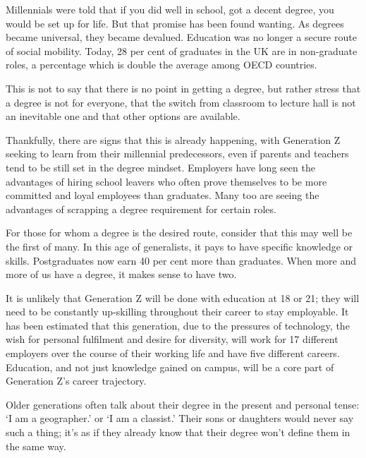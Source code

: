 Millennials were told that if you did well in school, got a decent
degree, you would be set up for life. But that
promise has been found wanting. As degrees became universal, they became
devalued. Education was no longer a
secure route of social mobility. Today, 28 per cent of graduates in the
UK are in non-graduate roles, a percentage
which is double the average among OECD countries.



This is not to say that there is no point in getting a degree, but
rather stress that a degree is not for everyone,
that the switch from classroom to lecture hall is not an inevitable one
and that other options are available.




Thankfully, there are signs that this is already happening, with
Generation Z seeking to learn from their
millennial predecessors, even if parents and teachers tend to be still
set in the degree mindset. Employers have
long seen the advantages of hiring school leavers who often prove
themselves to be more committed and loyal
employees than graduates. Many too are seeing the advantages of
scrapping a degree requirement for certain roles.




For those for whom a degree is the desired route, consider that this may
well be the first of many. In this age
of generalists, it pays to have specific knowledge or skills.
Postgraduates now earn 40 per cent more than
graduates. When more and more of us have a degree, it makes sense to
have two.




It is unlikely that Generation Z will be done with education at 18 or
21; they will need to be constantly
up-skilling throughout their career to stay employable. It has been
estimated that this generation, due to the
pressures of technology, the wish for personal fulfilment and desire for
diversity, will work for 17 different
employers over the course of their working life and have five different
careers. Education, and not just knowledge
gained on campus, will be a core part of Generation Z's career
trajectory.



Older generations often talk about their degree in the present and
personal tense: `I am a geographer.' or `I
am a classist.' Their sons or daughters would never say such a thing;
it's as if they already know that their degree
won't define them in the same way.

